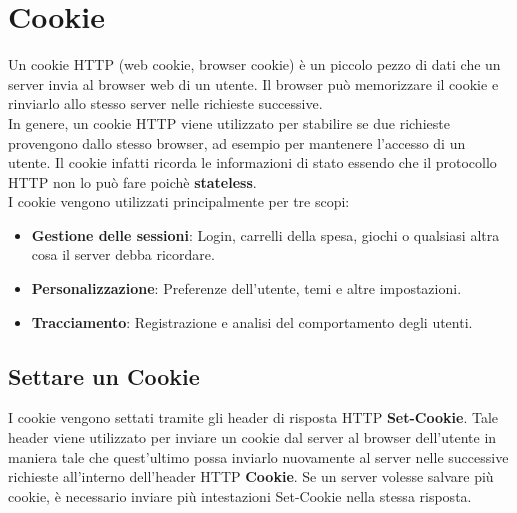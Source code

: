 \chapter{Cookie}

Un cookie HTTP (web cookie, browser cookie) è un piccolo pezzo di dati che un server invia al browser web di un utente. Il browser può memorizzare il cookie e rinviarlo allo stesso server nelle richieste successive.\\

In genere, un cookie HTTP viene utilizzato per stabilire se due richieste provengono dallo stesso browser, ad
esempio per mantenere l'accesso di un utente. Il cookie infatti ricorda le informazioni di stato essendo che il protocollo HTTP non lo può fare poichè \textbf{stateless}.\\

I cookie vengono utilizzati principalmente per tre scopi:
\begin{itemize}
	\item \textbf{Gestione delle sessioni}: Login, carrelli della spesa, giochi o qualsiasi altra cosa il server debba ricordare.
	\item \textbf{Personalizzazione}: Preferenze dell'utente, temi e altre impostazioni.
	\item \textbf{Tracciamento}: Registrazione e analisi del comportamento degli utenti.
\end{itemize}

\section{Settare un Cookie}
I cookie vengono settati tramite gli header di risposta HTTP \textbf{Set-Cookie}. Tale header viene utilizzato per inviare un cookie dal server al browser dell'utente  in maniera tale che quest'ultimo possa inviarlo nuovamente al server nelle successive richieste all'interno dell'header HTTP \textbf{Cookie}. Se un server volesse salvare più cookie, è necessario inviare più intestazioni Set-Cookie nella stessa risposta.

